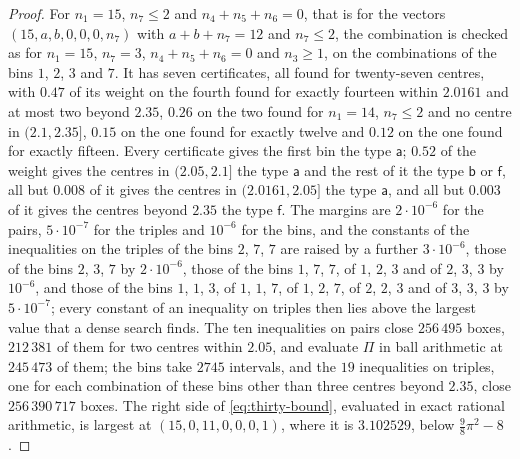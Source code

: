 \documentclass[11pt,reqno]{amsart}
\renewcommand{\_}{\origunderscore\allowbreak}
\numberwithin{equation}{section}
\theoremstyle{plain}
\theoremstyle{definition}
\theoremstyle{remark}
\begin{document}
\begin{proof}
For $n_1=15$, $n_7\le2$ and $n_4+n_5+n_6=0$, that is for the vectors
$(15,a,b,0,0,0,n_7)$ with $a+b+n_7=12$ and $n_7\le2$, the combination is
checked as for $n_1=15$, $n_7=3$, $n_4+n_5+n_6=0$ and $n_3\ge1$, on the
combinations of the bins $1$, $2$, $3$ and $7$. It has seven certificates,
all found for twenty-seven centres, with $0.47$ of its weight on the fourth
found for exactly fourteen within $2.0161$ and at most two beyond $2.35$,
$0.26$ on the two found for $n_1=14$, $n_7\le2$ and no centre in
$(2.1,2.35]$, $0.15$ on the one found for exactly twelve and $0.12$ on the
one found for exactly fifteen. Every certificate gives the first bin the
type $\mathsf a$; $0.52$ of the weight gives the centres in $(2.05,2.1]$
the type $\mathsf a$ and the rest of it the type $\mathsf b$ or
$\mathsf f$, all but $0.008$ of it gives the centres in $(2.0161,2.05]$ the
type $\mathsf a$, and all but $0.003$ of it gives the centres beyond
$2.35$ the type $\mathsf f$. The margins are $2\cdot10^{-6}$ for the
pairs, $5\cdot10^{-7}$ for the triples and $10^{-6}$ for the bins, and the
constants of the inequalities on the triples of the bins $2$, $7$, $7$ are
raised by a further $3\cdot10^{-6}$, those of the bins $2$, $3$, $7$ by
$2\cdot10^{-6}$, those of the bins $1$, $7$, $7$, of $1$, $2$, $3$ and of
$2$, $3$, $3$ by $10^{-6}$, and those of the bins $1$, $1$, $3$, of $1$,
$1$, $7$, of $1$, $2$, $7$, of $2$, $2$, $3$ and of $3$, $3$, $3$ by
$5\cdot10^{-7}$; every constant of an inequality on triples then lies
above the largest value that a dense search finds. The ten inequalities on
pairs close $256\,495$ boxes, $212\,381$ of them for two centres within
$2.05$, and evaluate $\Pi$ in ball arithmetic at $245\,473$ of them; the
bins take $2745$ intervals, and the $19$ inequalities on triples, one for
each combination of these bins other than three centres beyond $2.35$,
close $256\,390\,717$ boxes. The right side of \eqref{eq:thirty-bound},
evaluated in exact rational arithmetic, is largest at $(15,0,11,0,0,0,1)$,
where it is $3.102529$, below $\frac98\pi^2-8$.


\end{proof}
\end{document}

